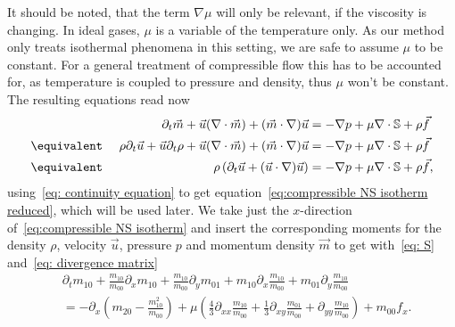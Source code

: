 It should be noted, that the term $\nabla \mu$ will only be relevant, if the viscosity is changing.
In ideal gases, $\mu$ is a variable of the temperature only.
As our method only treats isothermal phenomena in this setting, we are safe to assume $\mu$ to be constant.
For a general treatment of compressible flow this has to be accounted for, as temperature is coupled to pressure and density, thus $\mu$ won't be constant.
The resulting equations read now
\begin{alignat}{3}
  \label{eq:compressible NS isotherm}
  &&\partial_t \vec{m} + \vec{u}(\nabla \cdot \vec{m}) + (\vec{m} \cdot \nabla)\vec{u}
    &= - \nabla p + \mu \nabla \cdot \mathbb{S} + \rho \vec{f}\\
  \nonumber
  &\equivalent\ & \rho\partial_t \vec{u} + \vec{u}\partial_t \rho + \vec{u}(\nabla \cdot \vec{m}) + (\vec{m} \cdot \nabla)\vec{u}
    &= - \nabla p + \mu \nabla \cdot \mathbb{S} + \rho \vec{f}\\
  \label{eq:compressible NS isotherm reduced}
  &\equivalent& \rho\left(\partial_t \vec{u} + (\vec{u} \cdot \nabla)\vec{u}\right)
    &= - \nabla p + \mu \nabla \cdot \mathbb{S} + \rho \vec{f},
\end{alignat}
using~\eqref{eq: continuity equation} to get equation~\eqref{eq:compressible NS isotherm reduced}, which will be used later.
We take just the $x$-direction of~\eqref{eq:compressible NS isotherm} and insert the corresponding moments for the density $\rho$, velocity $\vec{u}$, pressure $p$ and momentum density $\vec{m}$ to get with~\eqref{eq: S} and~\eqref{eq: divergence matrix}
\begin{equation}
  \label{eq: navier stokes goal}
  \begin{aligned}
    & \partial_t m_{10}
    + \frac{m_{10}}{m_{00}} \partial_x m_{10}
    + \frac{m_{10}}{m_{00}}\partial_y m_{01}
    + m_{10} \partial_x \frac{m_{10}}{m_{00}}
    + m_{01} \partial_y \frac{m_{10}}{m_{00}}
     \\
    & =
    - \partial_x \left(m_{20} - \frac{ m_{10}^2 }{ m_{00} } \right)
     + \mu \left(\frac{4}{3}\partial_{xx}\frac{m_{10}}{m_{00}}
            + \frac{1}{3}\partial_{xy} \frac{m_{01}}{m_{00}}
            + \partial_{yy} \frac{m_{10}}{m_{00}} \right) + m_{00}f_x.
  \end{aligned}
\end{equation}
